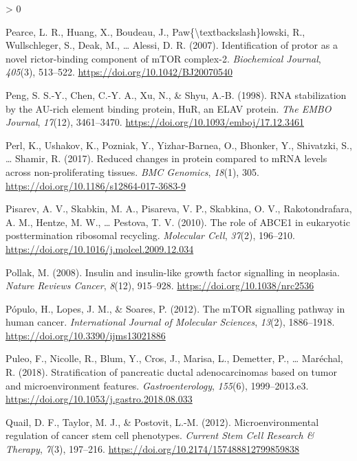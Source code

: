 \documentclass[
  12pt,
  openany]{book}
\newlength{\cslhangindent}
\newenvironment{CSLReferences}[2] %
 {%
  \setlength{\parindent}{0pt}
  \ifodd #1 \everypar{\setlength{\hangindent}{\cslhangindent}}\ignorespaces\fi
  \ifnum #2 > 0
  \setlength{\parskip}{#2\baselineskip}
  \fi
 }%
 {}
\begin{document}
\begin{CSLReferences}{1}{0}
\leavevmode\hypertarget{ref-Pearce2007}{}%
Pearce, L. R., Huang, X., Boudeau, J., Paw\{\textbackslash textbackslash\}lowski, R., Wullschleger, S., Deak, M., \ldots{} Alessi, D. R. (2007). Identification of protor as a novel rictor-binding component of {mTOR} complex-2. \emph{Biochemical Journal}, \emph{405}(3), 513--522. \url{https://doi.org/10.1042/BJ20070540}

\leavevmode\hypertarget{ref-Peng1998}{}%
Peng, S. S.-Y., Chen, C.-Y. A., Xu, N., \& Shyu, A.-B. (1998). {RNA} stabilization by the {AU}-rich element binding protein, {HuR}, an {ELAV} protein. \emph{The {EMBO} Journal}, \emph{17}(12), 3461--3470. \url{https://doi.org/10.1093/emboj/17.12.3461}

\leavevmode\hypertarget{ref-Perl2017}{}%
Perl, K., Ushakov, K., Pozniak, Y., Yizhar-Barnea, O., Bhonker, Y., Shivatzki, S., \ldots{} Shamir, R. (2017). Reduced changes in protein compared to {mRNA} levels across non-proliferating tissues. \emph{{BMC} Genomics}, \emph{18}(1), 305. \url{https://doi.org/10.1186/s12864-017-3683-9}

\leavevmode\hypertarget{ref-Pisarev2010}{}%
Pisarev, A. V., Skabkin, M. A., Pisareva, V. P., Skabkina, O. V., Rakotondrafara, A. M., Hentze, M. W., \ldots{} Pestova, T. V. (2010). The role of {ABCE}1 in eukaryotic posttermination ribosomal recycling. \emph{Molecular Cell}, \emph{37}(2), 196--210. \url{https://doi.org/10.1016/j.molcel.2009.12.034}

\leavevmode\hypertarget{ref-Pollak2008}{}%
Pollak, M. (2008). Insulin and insulin-like growth factor signalling in neoplasia. \emph{Nature Reviews Cancer}, \emph{8}(12), 915--928. \url{https://doi.org/10.1038/nrc2536}

\leavevmode\hypertarget{ref-Populo2012}{}%
Pópulo, H., Lopes, J. M., \& Soares, P. (2012). The {mTOR} signalling pathway in human cancer. \emph{International Journal of Molecular Sciences}, \emph{13}(2), 1886--1918. \url{https://doi.org/10.3390/ijms13021886}

\leavevmode\hypertarget{ref-Puleo2018}{}%
Puleo, F., Nicolle, R., Blum, Y., Cros, J., Marisa, L., Demetter, P., \ldots{} Maréchal, R. (2018). Stratification of pancreatic ductal adenocarcinomas based on tumor and microenvironment features. \emph{Gastroenterology}, \emph{155}(6), 1999--2013.e3. \url{https://doi.org/10.1053/j.gastro.2018.08.033}

\leavevmode\hypertarget{ref-Quail2012}{}%
Quail, D. F., Taylor, M. J., \& Postovit, L.-M. (2012). Microenvironmental regulation of cancer stem cell phenotypes. \emph{Current Stem Cell Research \& Therapy}, \emph{7}(3), 197--216. \url{https://doi.org/10.2174/157488812799859838}


\end{CSLReferences}
\end{document}
